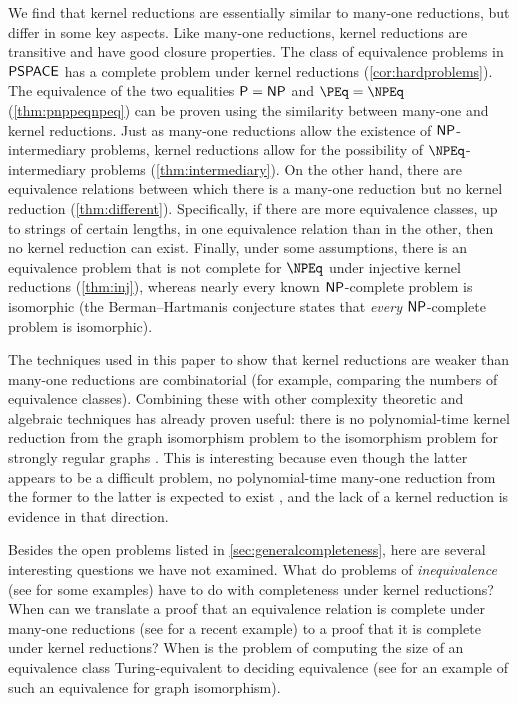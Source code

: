 %
We find that kernel reductions are essentially similar to many-one reductions, but differ in some key aspects.
Like many-one reductions, kernel reductions are transitive and have good closure properties.
The class of equivalence problems in ${\mathsf{PSPACE}}$ has a complete problem under kernel reductions (\autoref{cor:hardproblems}).
The equivalence of the two equalities ${\mathsf{P}} = {\mathsf{NP}}$ and $\PEq = \NPEq$ (\autoref{thm:pnppeqnpeq}) can be proven using the similarity between many-one and kernel reductions.
Just as many-one reductions allow the existence of ${\mathsf{NP}}$-intermediary problems, kernel reductions allow for the possibility of $\NPEq$-intermediary problems (\autoref{thm:intermediary}).
On the other hand, there are equivalence relations between which there is a many-one reduction but no kernel reduction (\autoref{thm:different}).
Specifically, if there are more equivalence classes, up to strings of certain lengths, in one equivalence relation than in the other, then no kernel reduction can exist.
Finally, under some assumptions, there is an equivalence problem that is not complete for $\NPEq$ under injective kernel reductions (\autoref{thm:inj}), whereas nearly every known ${\mathsf{NP}}$-complete problem is isomorphic (the Berman--Hartmanis conjecture \autocite{bh77} states that \emph{every} ${\mathsf{NP}}$-complete problem is isomorphic).

The techniques used in this paper to show that kernel reductions are weaker than many-one reductions are combinatorial (for example, comparing the numbers of equivalence classes).
Combining these with other complexity theoretic and algebraic techniques has already proven useful: there is no polynomial-time kernel reduction from the graph isomorphism problem to the isomorphism problem for strongly regular graphs \autocite[Theorem~22]{babai14}.
This is interesting because even though the latter appears to be a difficult problem, no polynomial-time many-one reduction from the former to the latter is expected to exist \autocite{babai14}, and the lack of a kernel reduction is evidence in that direction.

Besides the open problems listed in \autoref{sec:generalcompleteness}, here are several interesting questions we have not examined.
What do problems of \emph{inequivalence} (see \autocite{gj79} for some examples) have to do with completeness under kernel reductions?
When can we translate a proof that an equivalence relation is complete under many-one reductions (see \autocite[Theorem~1]{rs11} for a recent example) to a proof that it is complete under kernel reductions?
When is the problem of computing the size of an equivalence class Turing-equivalent to deciding equivalence (see \autocite[Theorem~1.24]{kst93} for an example of such an equivalence for graph isomorphism).
